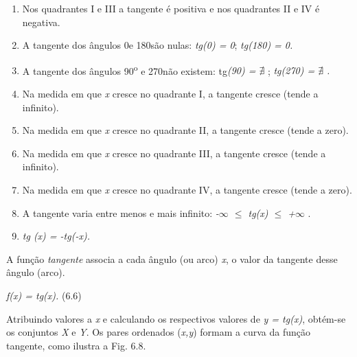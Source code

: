 \begin{caixa}
\begin{enumerate}
    \item Nos quadrantes I e III a tangente é positiva e nos quadrantes II e IV é negativa.

    \item A tangente dos ângulos 0\degree e 180\degree  são nulas:\textit{ tg(0\degree) = 0};  \textit{tg(180\degree) = 0.}

    \item A tangente dos ângulos 90\textsuperscript{o} e 270\degree não existem: tg\textit{(90\degree) =  \(  \nexists  \) };  \textit{tg(270\degree) =  \(  \nexists  \) .}

    \item Na medida em que \textit{x} cresce no quadrante I, a tangente cresce (tende a infinito).

    \item Na medida em que \textit{x} cresce no quadrante II, a tangente cresce (tende a zero).

    \item Na medida em que \textit{x} cresce no quadrante III, a tangente cresce (tende a infinito).

    \item Na medida em que \textit{x} cresce no quadrante IV, a tangente cresce (tende a zero).

    \item A tangente varia entre menos e mais infinito:   \textit{-$\infty $ $ \leq $  tg(x) $ \leq $  +$\infty $ }.

    \item \textit{tg (x) = -tg(-x).}
\end{enumerate}
\end{caixa}

\begin{caixa}
A função \textit{tangente} associa a cada ângulo (ou arco) \textit{x}, o valor da tangente desse ângulo (arco).

\textit{f(x) = tg(x).} \tab (6.6)
\end{caixa}

Atribuindo valores a \textit{x} e calculando os respectivos valores de \textit{y = tg(x)}, obtém-se os conjuntos \textit{X }e\textit{ Y}. Os pares ordenados (\textit{x,y}) formam a curva da função tangente, como ilustra a Fig. 6.8.

